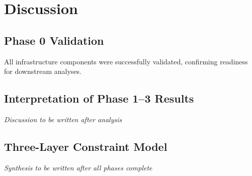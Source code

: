 \chapter{Discussion}

\section{Phase 0 Validation}

All infrastructure components were successfully validated, confirming readiness for downstream analyses.

\section{Interpretation of Phase 1--3 Results}

\textit{Discussion to be written after analysis}

\section{Three-Layer Constraint Model}

\textit{Synthesis to be written after all phases complete}

